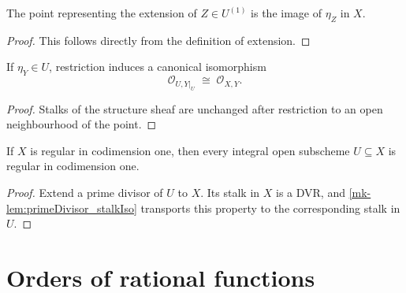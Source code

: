 \begin{lemma}
  \label{mk-lem:primeDivisor_ofOpen_point}
  \leanok


  The point representing the extension of \(Z\in U^{(1)}\) is the image of
  \(\eta_Z\) in \(X\).
\end{lemma}
\begin{proof}
  \leanok
  This follows directly from the definition of extension.
\end{proof}

\begin{lemma}
  \label{mk-lem:primeDivisor_stalkIso}
  \leanok


  If \(\eta_Y\in U\), restriction induces a canonical isomorphism
  \[
    \mathcal O_{U,Y|_U}\;\cong\;\mathcal O_{X,Y}.
  \]
\end{lemma}
\begin{proof}
  \leanok
  Stalks of the structure sheaf are unchanged after restriction to an open
  neighbourhood of the point.
\end{proof}

\begin{theorem}
  \label{mk-thm:isRegularInCodimensionOne_open}
  \leanok


  If \(X\) is regular in codimension one, then every integral open subscheme
  \(U\subseteq X\) is regular in codimension one.
\end{theorem}
\begin{proof}
  \leanok
  Extend a prime divisor of \(U\) to \(X\).  Its stalk in \(X\) is a DVR, and
  \ref{mk-lem:primeDivisor_stalkIso} transports this property to the
  corresponding stalk in \(U\).
\end{proof}

\section{Orders of rational functions}

